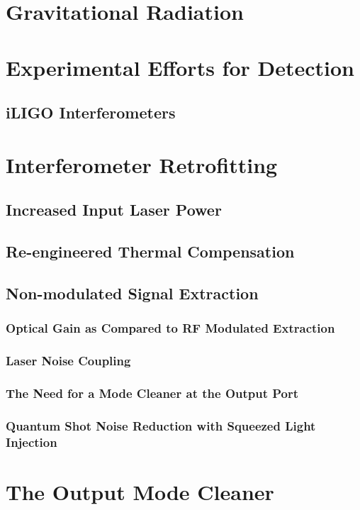 \documentclass[12pt,vi,twoside]{mitthesis}
\begin{document}

\pagestyle{plain}

%


\chapter{Gravitational Radiation}

\chapter{Experimental Efforts for Detection}
\section{iLIGO Interferometers}

\chapter{Interferometer Retrofitting}
\label{ch:retro}
\section{Increased Input Laser Power}
\section{Re-engineered Thermal Compensation}
\section{Non-modulated Signal Extraction}
\subsection{Optical Gain as Compared to RF Modulated Extraction}
\subsection{Laser Noise Coupling}
\subsection{The Need for a Mode Cleaner at the Output Port}
\subsection{Quantum Shot Noise Reduction with Squeezed Light Injection}

\chapter{The Output Mode Cleaner}
\end{document}
